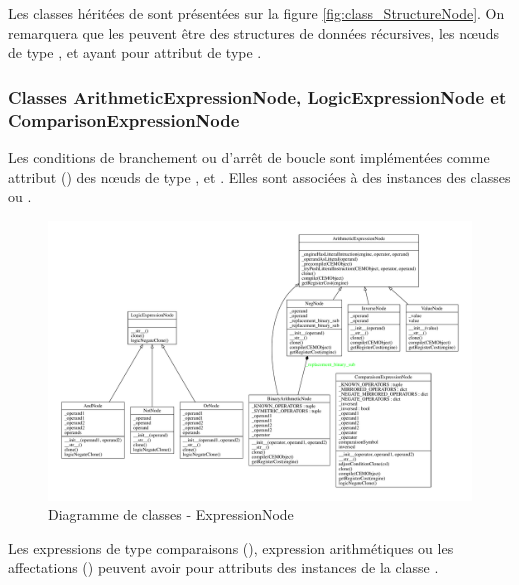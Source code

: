 Les classes héritées de  sont présentées sur la figure \ref{fig:class_StructureNode}. On remarquera que les  peuvent être des structures de données récursives, les n\oe uds de type ,  et  ayant pour attribut  de type .
\clearpage

\subsubsection{Classes ArithmeticExpressionNode, LogicExpressionNode et ComparisonExpressionNode}

Les conditions de branchement  ou d'arrêt de boucle  sont implémentées comme attribut () des n\oe uds de type ,  et . Elles sont associées à des instances des classes  ou .

\begin{figure}[h!]
	\centering
	\includegraphics[width=\textwidth]{./Pictures/ExpressionNode.pdf}
	\caption{\label{fig:class_ExpressionNode}Diagramme de classes - ExpressionNode}
\end{figure}

Les expressions de type comparaisons (), expression arithmétiques  ou les affectations () peuvent avoir pour attributs des instances de la classe .